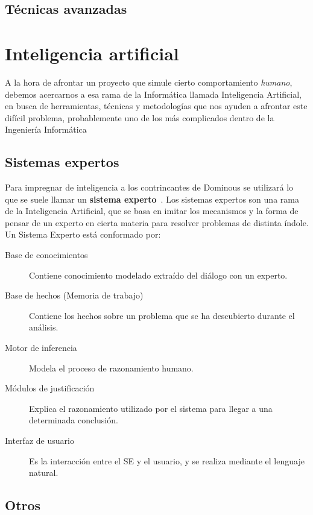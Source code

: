 \subsection{Técnicas avanzadas}

\section{Inteligencia artificial}

A la hora de afrontar un proyecto que simule cierto comportamiento \emph{humano}, debemos acercarnos a esa rama de la
Informática llamada Inteligencia Artificial, en busca de herramientas, técnicas y metodologías que nos ayuden a afrontar este
difícil problema, probablemente uno de los más complicados dentro de la Ingeniería Informática

\subsection{Sistemas expertos}

Para impregnar de inteligencia a los contrincantes de Dominous se utilizará lo que se suele llamar un
\textbf{sistema experto}~\cite{Giarratano:1989:ESP:583478}.
Los sistemas expertos son una rama de la Inteligencia Artificial, que se basa en imitar los mecanismos y la forma de
pensar de un experto en cierta materia para resolver problemas de distinta índole.\\

Un Sistema Experto está conformado por:
\begin{description}
    \item[Base de conocimientos] Contiene conocimiento modelado extraído del diálogo con un experto.
    \item[Base de hechos (Memoria de trabajo)] Contiene los hechos sobre un problema que se ha descubierto durante el análisis.
    \item[Motor de inferencia] Modela el proceso de razonamiento humano.
    \item[Módulos de justificación] Explica el razonamiento utilizado por el sistema para llegar a una determinada conclusión.
    \item[Interfaz de usuario] Es la interacción entre el SE y el usuario, y se realiza mediante el lenguaje natural.
\end{description}

\subsection{Otros}
